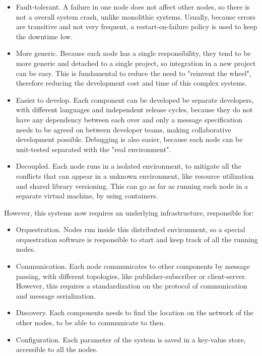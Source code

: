 \begin{itemize}
    \item Fault-tolerant. A failure in one node does not affect other nodes, so there is not a overall system crash, unlike monolithic systems. Usually, because errors are transitive and not very frequent, a restart-on-failure policy is used to keep the downtime low.
    \item More generic. Because each node has a single responsibility, they tend to be more generic and detached to a single project, so integration in a new project can be easy. This is fundamental to reduce the need to "reinvent the wheel", therefore reducing the development cost and time of this complex systems.
    \item Easier to develop. Each component can be developed be separate developers, with different languages and independent release cycles, because they do not have any dependency between each over and only a message specification needs to be agreed on between developer teams, making collaborative development possible. Debugging is also easier, because each node can be unit-tested separated with the "real environment".
    \item Decoupled. Each node runs in a isolated environment, to mitigate all the conflicts that can appear in a unknown environment, like resource utilization and shared library versioning. This can go as far as running each node in a separate virtual machine, by using containers.
\end{itemize}

However, this systems now requires an underlying infrastructure, responsible for:

\begin{itemize}
    \item Orquestration. Nodes run inside this distributed environment, so a special orquestration software is responsible to start and keep track of all the running nodes.
    \item Communication. Each node communicates to other components by message passing, with different topologies, like publisher-subscriber or client-server. However, this requires a standardization on the protocol of communication and message serialization.
    \item Discovery. Each components needs to find the location on the network of the other nodes, to be able to communicate to then.
    \item Configuration. Each parameter of the system is saved in a key-value store, accessible to all the nodes.
\end{itemize}

